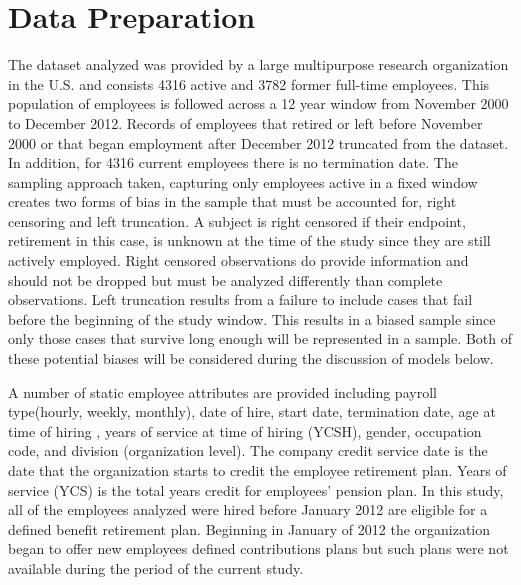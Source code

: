 \documentclass[12pt,letterpaper]{article}
\begin{document}
\section{Data Preparation}\label{data.desc}
The dataset analyzed was provided by a large multipurpose research organization in the U.S. and consists 4316 active and 3782 former full-time employees.  This population of employees is followed across a 12 year window from November 2000 to December 2012.  Records of employees that retired or left before November 2000 or that began employment after December 2012 truncated from the dataset. In addition, for 4316 current employees there is no termination date. The sampling approach taken, capturing only employees active in a fixed window creates two forms of bias in the sample that must be accounted for, right censoring and left truncation. A subject is right censored if their endpoint, retirement in this case, is unknown at the time of the study since they are still actively employed.  Right censored observations do provide information and should not be dropped but must be analyzed differently than complete observations.   Left truncation results from a failure to include cases that fail before the beginning of the study window.  This results in a biased sample since only those cases that survive long enough will be represented in a sample.  Both of these potential biases will be considered during the discussion of models below.


A number of static employee attributes are provided including payroll type(hourly, weekly, monthly), date of hire, start date, termination date, age at time of hiring , years of service at time of hiring (YCSH), gender, occupation code, and division (organization level). The company credit service date is the date that the organization starts to credit the employee retirement plan. Years of service (YCS) is the total years credit for employees' pension plan. In this study, all of the employees analyzed were hired before January 2012 are eligible for a defined benefit retirement plan. Beginning in January of 2012 the organization began to offer new employees defined contributions plans but such plans were not available during the period of the current study.
\end{document}
